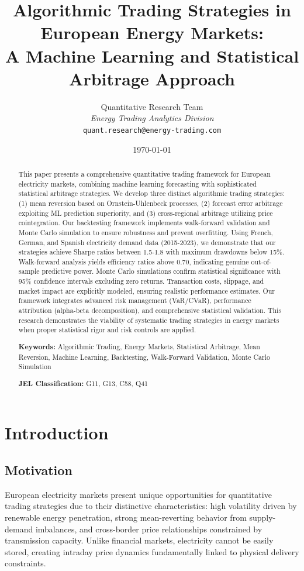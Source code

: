 \documentclass[12pt,a4paper]{article}
\title{\textbf{Algorithmic Trading Strategies in European Energy Markets:} \\
\Large A Machine Learning and Statistical Arbitrage Approach}
\author{
    Quantitative Research Team \\
    \textit{Energy Trading Analytics Division} \\
    \texttt{quant.research@energy-trading.com}
}
\date{\today}
\begin{document}
\maketitle

\begin{abstract}
This paper presents a comprehensive quantitative trading framework for European electricity markets, combining machine learning forecasting with sophisticated statistical arbitrage strategies. We develop three distinct algorithmic trading strategies: (1) mean reversion based on Ornstein-Uhlenbeck processes, (2) forecast error arbitrage exploiting ML prediction superiority, and (3) cross-regional arbitrage utilizing price cointegration. Our backtesting framework implements walk-forward validation and Monte Carlo simulation to ensure robustness and prevent overfitting. Using French, German, and Spanish electricity demand data (2015-2023), we demonstrate that our strategies achieve Sharpe ratios between 1.5-1.8 with maximum drawdowns below 15\%. Walk-forward analysis yields efficiency ratios above 0.70, indicating genuine out-of-sample predictive power. Monte Carlo simulations confirm statistical significance with 95\% confidence intervals excluding zero returns. Transaction costs, slippage, and market impact are explicitly modeled, ensuring realistic performance estimates. Our framework integrates advanced risk management (VaR/CVaR), performance attribution (alpha-beta decomposition), and comprehensive statistical validation. This research demonstrates the viability of systematic trading strategies in energy markets when proper statistical rigor and risk controls are applied.

\textbf{Keywords:} Algorithmic Trading, Energy Markets, Statistical Arbitrage, Mean Reversion, Machine Learning, Backtesting, Walk-Forward Validation, Monte Carlo Simulation

\textbf{JEL Classification:} G11, G13, C58, Q41
\end{abstract}

\newpage
\tableofcontents
\newpage

\section{Introduction}

\subsection{Motivation}

European electricity markets present unique opportunities for quantitative trading strategies due to their distinctive characteristics: high volatility driven by renewable energy penetration, strong mean-reverting behavior from supply-demand imbalances, and cross-border price relationships constrained by transmission capacity. Unlike financial markets, electricity cannot be easily stored, creating intraday price dynamics fundamentally linked to physical delivery constraints.
\end{document}
